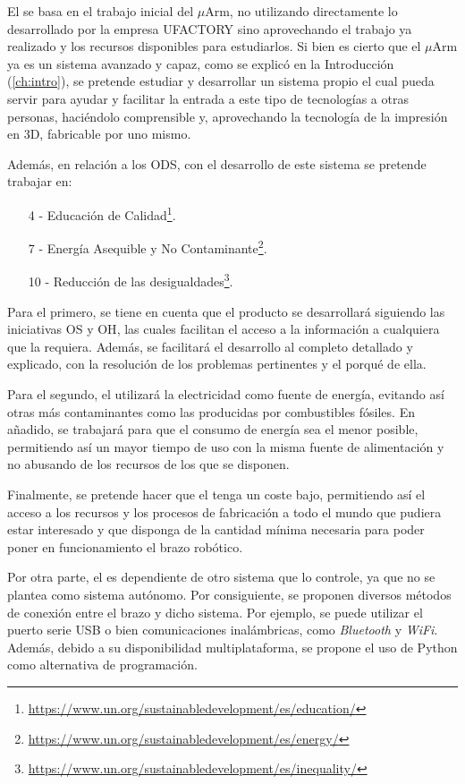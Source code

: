 El \pArm{} se basa en el trabajo inicial del $\mu$Arm, no utilizando directamente lo desarrollado por la empresa UFACTORY sino aprovechando el trabajo ya realizado y los recursos disponibles para estudiarlos. Si bien es cierto que el $\mu$Arm ya es un sistema avanzado y capaz, como se explicó en la Introducción (\ref{ch:intro}), se pretende estudiar y desarrollar un sistema propio el cual pueda servir para ayudar y facilitar la entrada a este tipo de tecnologías a otras personas, haciéndolo comprensible y, aprovechando la tecnología de la impresión en 3D, fabricable por uno mismo.

Además, en relación a los \ac{ODS}, con el desarrollo de este sistema se pretende trabajar en:

\begin{itemize}
    \item [4 -] Educación de Calidad\footnote{\url{https://www.un.org/sustainabledevelopment/es/education/}}.
    \item [7 -] Energía Asequible y No Contaminante\footnote{\url{https://www.un.org/sustainabledevelopment/es/energy/}}.
    \item [10 -] Reducción de las desigualdades\footnote{\url{https://www.un.org/sustainabledevelopment/es/inequality/}}.
\end{itemize}

Para el primero, se tiene en cuenta que el producto se desarrollará siguiendo las iniciativas \ac{OS} y \ac{OH}, las cuales facilitan el acceso a la información a cualquiera que la requiera. Además, se facilitará el desarrollo al completo detallado y explicado, con la resolución de los problemas pertinentes y el porqué de ella.

Para el segundo, el \pArm{} utilizará la electricidad como fuente de energía, evitando así otras más contaminantes como las producidas por combustibles fósiles. En añadido, se trabajará para que el consumo de energía sea el menor posible, permitiendo así un mayor tiempo de uso con la misma fuente de alimentación y no abusando de los recursos de los que se disponen.

Finalmente, se pretende hacer que el \pArm{} tenga un coste bajo, permitiendo así el acceso a los recursos y los procesos de fabricación a todo el mundo que pudiera estar interesado y que disponga de la cantidad mínima necesaria para poder poner en funcionamiento el brazo robótico.

Por otra parte, el \pArm{} es dependiente de otro sistema que lo controle, ya que no se plantea como sistema autónomo. Por consiguiente, se proponen diversos métodos de conexión entre el brazo y dicho sistema. Por ejemplo, se puede utilizar el puerto serie \ac{USB} o bien comunicaciones inalámbricas, como \textit{Bluetooth} y \textit{WiFi}. Además, debido a su disponibilidad multiplataforma, se propone el uso de Python como alternativa de programación.

